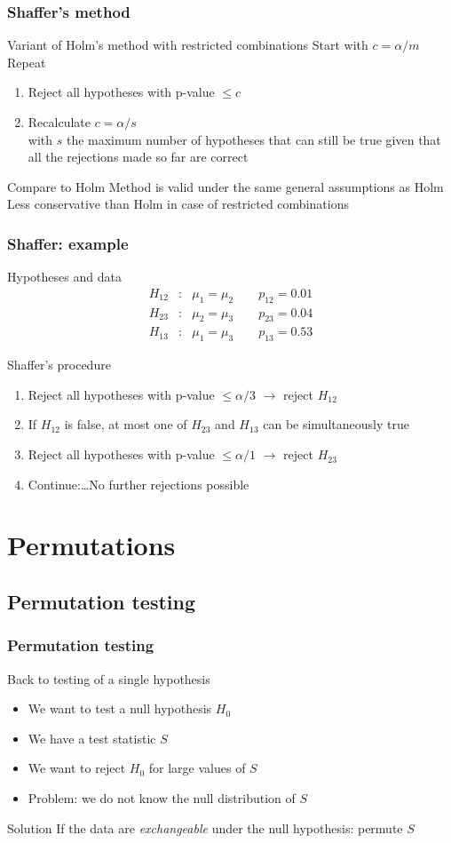 \documentclass[compress]{beamer}
\newcommand{\bb}[1]{\begin{block}{#1}}
\newcommand{\eb}{\end{block}}
\newcommand{\bi}{\begin {itemize}}
\newcommand{\ei}{\end{itemize}}
\newcommand{\be}{\begin {enumerate}}
\newcommand{\ee}{\end{enumerate}}
\newcommand{\bfr}[1]{\begin{frame} \frametitle{#1}}
\begin{document}
\bfr{Shaffer's method}
  \bb{Variant of Holm's method with restricted combinations}
    Start with $c = \alpha/m$
    \\ Repeat
    \be
      \item Reject all hypotheses with p-value $\leq c$
      \item Recalculate $c = \alpha/s$ \\ with $s$ the maximum number of hypotheses that can still be true given that all the rejections made so far are correct
    \ee
  \eb
  \bb{Compare to Holm}
    Method is valid under the same general assumptions as Holm
    \\ Less conservative than Holm in case of restricted combinations
  \eb
\end{frame}

\bfr{Shaffer: example}
  \bb{Hypotheses and data}
    \begin{eqnarray*}
      H_{12}&:& \mu_1=\mu_2 \qquad p_{12} = 0.01\\
      H_{23}&:& \mu_2=\mu_3 \qquad p_{23} = 0.04\\
      H_{13}&:& \mu_1=\mu_3 \qquad p_{13} = 0.53
    \end{eqnarray*}
  \eb
  \bb{Shaffer's procedure}
    \be
      \item Reject all hypotheses with p-value $\leq \alpha/3$ $\to$ reject $H_{12}$
      \item If $H_{12}$ is false, at most one of $H_{23}$ and $H_{13}$ can be simultaneously true
      \item Reject all hypotheses with p-value $\leq \alpha/1$  $\to$ reject $H_{23}$
      \item Continue:\ldots No further rejections possible
    \ee
  \eb
\end{frame}


\section{Permutations}

\subsection{Permutation testing}

\bfr{Permutation testing}
  \bb{Back to testing of a single hypothesis}
    \bi
      \item We want to test a null hypothesis $H_0$
      \item We have a test statistic $S$
      \item We want to reject $H_0$ for large values of $S$
      \item Problem: we do not know the null distribution of $S$
    \ei
  \eb
  \bb{Solution}
    If the data are \emph{exchangeable} under the null hypothesis: permute $S$
  \eb
\end{frame}
\end{document}
